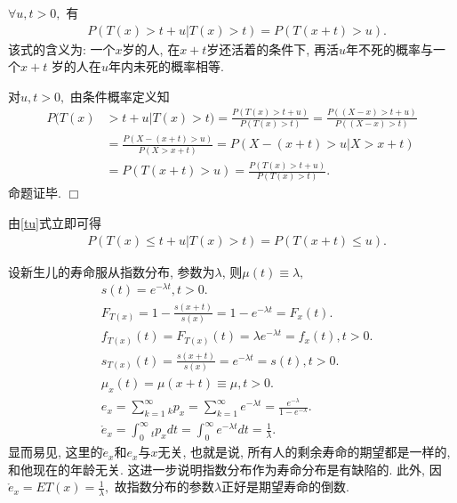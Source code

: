 \documentclass[a4paper,openany, 10pt]{ctexbook}
\def\qed{\hfill$\Box$\medskip}
\begin{document}
\begin{proposition}$\forall u,t>0,$ 有
    \begin{align}
         & P(T(x)>t+u|T(x)>t)=P(T(x+t)>u).\label{tu}
    \end{align}
    该式的含义为: 一个$x$岁的人, 在$x+t$岁还活着的条件下, 再活$u$年不死的概率与一个$x+t$ 岁的人在$u$年内未死的概率相等.
\end{proposition}

\proof 对$u,t>0,$ 由条件概率定义知
\begin{align*}
    P(T(x) & >t+u|T(x)>t)=\frac{P(T(x)>t+u)}{P(T(x)>t)}=\frac{P((X-x)>t+u)}{P((X-x)>t)} \\
           & =\frac{P(X-(x+t)>u)}{P(X>x+t)}=  P(X-(x+t)>u|X>x+t)                        \\
           & =P(T(x+t)>u)=\frac{P(T(x)>t+u)}{P(T(x)>t)}.
\end{align*}
命题证毕. \qed

\begin{remark}由\eqref{tu}式立即可得
    \begin{align}\label{tul}
         & P(T(x)\leq t+u|T(x)>t)=P(T(x+t)\leq u).
    \end{align}
\end{remark}
\begin{example}
    设新生儿的寿命服从指数分布, 参数为$\lambda$, 则$\mu(t)\equiv\lambda,$
    \begin{align*}
         & s(t)=e^{-\lambda t},t>0.                                                                                       \\
         & F_{T(x)}=1-\frac{s(x+t)}{s(x)}=1-e^{- \lambda t}=F_x(t).                                                       \\
         & f_{T(x)}(t)=F_{T(x)}(t)=\lambda e^{- \lambda t}=f_x(t),t>0.                                                    \\
         & s_{T(x)}(t)=\frac{s(x+t)}{s(x)}=e^{-\lambda t}=s(t),t>0.                                                       \\
         & \mu_x(t)=\mu(x+t)\equiv\mu,t>0.                                                                                \\
         & e_x = \sum_{k=1}^{\infty} {_kp_x}=\sum_{k=1}^{\infty} {e^{- \lambda t}}=\frac{e^{- \lambda}}{1-e^{- \lambda}}. \\
         & \mathring{e}_x=\int_{0}^{\infty}{_tp_x}dt=\int_{0}^{\infty}{e^{- \lambda t}}dt=\frac{1}{\lambda}.
    \end{align*}
    显而易见, 这里的$\mathring e_x $和$e_x$与$x$无关, 也就是说,  所有人的剩余寿命的期望都是一样的, 和他现在的年龄无关. 这进一步说明指数分布作为寿命分布是有缺陷的.   此外, 因$\mathring{e}_x=ET(x)=\frac{1}{\lambda},$ 故指数分布的参数$\lambda$正好是期望寿命的倒数.
\end{example}
\end{document}
